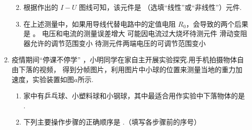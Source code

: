 \begin{enumerate}
\begin{enumerate}
\begin{figure}[h!]
\begin{tikzpicture}
\end{tikzpicture}
\end{figure}

\item 
根据作出的 $ I-U $ 图线可知，该元件是 \underlinegap （选填“线性”或“非线性”）元件.
\item 
在上述测量中，如果用导线代替电路中的定值电阻 $ R_{0} $，会导致的两个后果是 \underlinegap 。
\fourchoices
{电压和电流的测量误差增大}
{可能因电流过大烧坏待测元件}
{滑动变阻器允许的调节范围变小}
{待测元件两端电压的可调节范围变小}


\end{enumerate}







\item
疫情期间“停课不停学”
，小明同学在家自主开展实验探究.用手机拍摄物体自由下落的视频，
得到分帧图片，利用图片中小球的位置来测量当地的重力加速度，实验装置如图$ a $所示.
\begin{figure}[h!]
\centering
\begin{subfigure}{0.35\linewidth}
\centering
 
\caption{}\label{}
\end{subfigure}
\begin{subfigure}{0.55\linewidth}
\centering
 
\caption{}\label{}
\end{subfigure}
\end{figure}
\begin{enumerate}
\item
家中有乒乓球、小塑料球和小钢球，其中最适合用作实验中下落物体的是 \underlinegap .
\item 
下列主要操作步骤的正确顺序是 \underlinegap .（填写各步骤前的序号）


\end{enumerate}
\end{enumerate}
